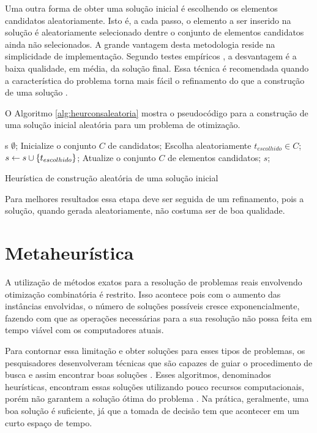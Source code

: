 Uma outra forma de obter uma solução inicial é escolhendo os elementos candidatos aleatoriamente. Isto é, a cada passo, o elemento a ser inserido na solução é aleatoriamente selecionado dentre o conjunto de elementos candidatos ainda não selecionados. A grande vantagem desta metodologia reside na simplicidade de implementação. Segundo testes empíricos , a desvantagem é a baixa qualidade, em média, da solução final. Essa técnica é recomendada quando a característica do problema torna mais fácil o refinamento do que a construção de uma solução \citep{notasmarcone}. 

O Algoritmo \ref{alg:heurconsaleatoria} mostra o pseudocódigo para a construção de uma solução inicial aleatória para um problema de otimização.

\begin{pgrm}[h]
\begin{programma}
\STATE s \GETS $\emptyset$;
\STATE Inicialize o conjunto $C$ de candidatos;
\STATE Escolha aleatoriamente $t_{escolhido} \in C$;
\STATE $s \leftarrow s \cup \{t_{escolhido}\}$;
\STATE Atualize o conjunto $C$ de elementos candidatos;
\ENDWHILE
\STATE\RETURN $s$;
\ENDALGORITHM
\end{programma}
\caption{Heurística de construção aleatória de uma solução inicial}\label{alg:heurconsaleatoria}
\end{pgrm}

Para melhores resultados essa etapa deve ser seguida de um refinamento, pois a solução, quando gerada aleatoriamente, não costuma ser de boa qualidade.

\section{Metaheurística}

A utilização de métodos exatos para a resolução de problemas reais envolvendo otimização combinatória é restrito. Isso acontece pois com o aumento das instâncias envolvidas, o número de soluções possíveis cresce exponencialmente, fazendo com que as operações necessárias para a sua resolução não possa feita em tempo viável com os computadores atuais.  

Para contornar essa limitação e obter soluções para esses tipos de problemas, os pesquisadores desenvolveram técnicas que são capazes de guiar o procedimento de busca e assim encontrar boas soluções \cite{maritan2009}. Esses algoritmos, denominados heurísticas, encontram essas soluções utilizando pouco recursos computacionais, porém não garantem a solução ótima do problema \cite{dias2006}. Na prática, geralmente, uma boa solução é suficiente, já que a tomada de decisão tem que acontecer em um curto espaço de tempo.

